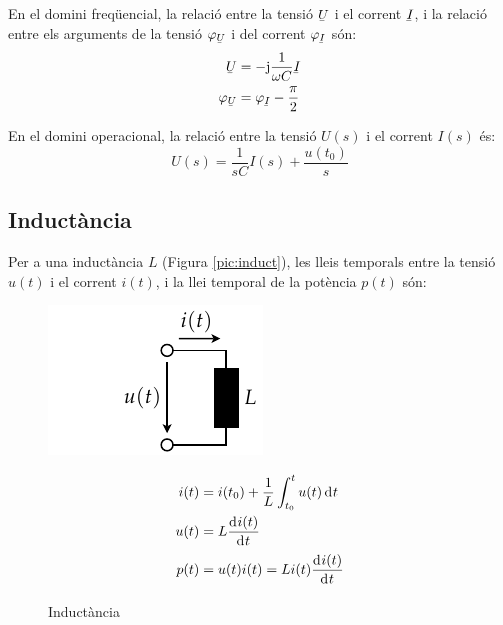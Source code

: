 En el domini freq\"{u}encial, la relaci\'{o} entre la tensi\'{o} $\cmplx{U}$ i el corrent $\cmplx{I}$, i la relaci\'{o} entre els arguments de la tensi\'{o} $\varphi_{\cmplx{U}}$ i del corrent $\varphi_{\cmplx{I}}$ s\'{o}n:
\begin{align}
   \cmplx{U} &= -\ju \frac{1}{\omega C} \cmplx{I} \\
   \varphi_{\cmplx{U}} &= \varphi_{\cmplx{I}} - \frac{\pi}{2}
\end{align}

En el domini operacional, la relaci\'{o} entre la tensi\'{o} $U(s)$ i el corrent $I(s)$ \'{e}s:
\begin{equation}
   U(s) = \frac{1}{s C} I(s) + \frac{u(t_0)}{s}
\end{equation}


\subsection{Induct\`{a}ncia} 

Per a una induct\`{a}ncia $L$ (Figura \vref{pic:induct}),
les lleis temporals entre la tensi\'{o} $u(t)$ i el corrent $i(t)$, i la llei temporal
de la pot\`{e}ncia $p(t)$ s\'{o}n:
\begin{figure}[htb]
\hfill
\begin{minipage}[b]{5cm}
    \includegraphics{Imatges/Cap-Fonaments-Inductancia.pdf}
\caption{Induct\`{a}ncia} \label{pic:induct}
\end{minipage}
\hfill
\begin{minipage}[b][3.8cm][t]{8cm}
   \begin{align}
      i(t) &= i(t_0) + \frac{1}{L} \int_{t_0}^t u(t) \diff t \\
      u(t) &= L \deriv{i(t)}{t} \\
      p(t) &= u(t) i(t) = L i(t) \deriv{i(t)}{t}
   \end{align}
\end{minipage}
\end{figure}


